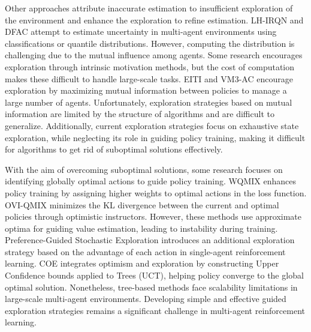 Other approaches attribute inaccurate estimation to insufficient exploration of the environment and enhance the exploration to refine estimation. LH-IRQN 
\cite{lyu2018likelihood} and DFAC \cite{sun2021dfac} attempt to estimate uncertainty in multi-agent environments using classifications or quantile distributions. However, computing the distribution is challenging due to the mutual influence among agents. Some research \cite{bohmer2019exploration,liu2021cooperative} encourages exploration through intrinsic motivation methods, but the cost of computation makes these difficult to handle large-scale tasks. EITI \cite{wang2019influence} and VM3-AC \cite{kim2020maximum} encourage exploration by maximizing mutual information between policies to manage a large number of agents. Unfortunately, exploration strategies based on mutual information are limited by the structure of algorithms and are difficult to generalize. Additionally, current exploration strategies focus on exhaustive state exploration, while neglecting its role in guiding policy training, making it difficult for algorithms to get rid of suboptimal solutions effectively.

With the aim of overcoming suboptimal solutions, some research focuses on identifying globally optimal actions to guide policy training. WQMIX \cite{rashid2020weighted} enhances policy training by assigning higher weights to optimal actions in the loss function. OVI-QMIX \cite{li2024optimistic} minimizes the KL divergence between the current and optimal policies through optimistic instructors. However, these methods use approximate optima for guiding value estimation, leading to instability
during training. Preference-Guided Stochastic Exploration \cite{huang2023sampling} introduces an additional exploration strategy based on the advantage of each action in single-agent reinforcement learning. COE \cite{zhao2023conditionally} integrates optimism and exploration by constructing Upper Confidence bounds applied to Trees (UCT), helping policy converge to the global optimal solution. Nonetheless, tree-based methods face scalability limitations in large-scale multi-agent environments. Developing simple and effective guided exploration strategies remains a significant challenge in multi-agent reinforcement learning.